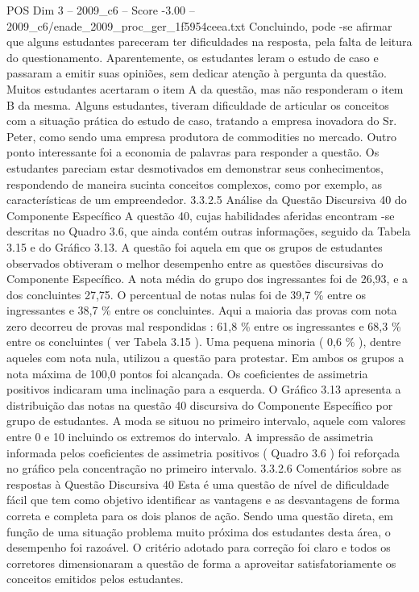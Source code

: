 \begin{textsample}{POS Dim 3 – 2009\_c6 – Score -3.00 – 2009\_c6/enade\_2009\_proc\_ger\_1f5954ceea.txt}
Concluindo, pode -se afirmar que alguns estudantes pareceram ter dificuldades na resposta, pela falta de leitura do questionamento.
Aparentemente, os estudantes leram o estudo de caso e passaram a emitir suas opiniões, sem dedicar atenção à pergunta da questão.
Muitos estudantes acertaram o item A da questão, mas não responderam o item B da mesma.
Alguns estudantes, tiveram dificuldade de articular os conceitos com a situação prática do estudo de caso, tratando a empresa inovadora do Sr.
Peter, como sendo uma empresa produtora de commodities no mercado.
Outro ponto interessante foi a economia de palavras para responder a questão.
Os estudantes pareciam estar desmotivados em demonstrar seus conhecimentos, respondendo de maneira sucinta conceitos complexos, como por exemplo, as características de um empreendedor. 3.3.2.5 Análise da Questão Discursiva 40 do Componente Específico A questão 40, cujas habilidades aferidas encontram -se descritas no Quadro 3.6, que ainda contém outras informações, seguido da Tabela 3.15 e do Gráfico 3.13.
A questão foi aquela em que os grupos de estudantes observados obtiveram o melhor desempenho entre as questões discursivas do Componente Específico.
A nota média do grupo dos ingressantes foi de 26,93, e a dos concluintes 27,75.
O percentual de notas nulas foi de 39,7 \% entre os ingressantes e 38,7 \% entre os concluintes.
Aqui a maioria das provas com nota zero decorreu de provas mal respondidas : 61,8 \% entre os ingressantes e 68,3 \% entre os concluintes ( ver Tabela 3.15 ).
Uma pequena minoria ( 0,6 \% ), dentre aqueles com nota nula, utilizou a questão para protestar.
Em ambos os grupos a nota máxima de 100,0 pontos foi alcançada.
Os coeficientes de assimetria positivos indicaram uma inclinação para a esquerda.
O Gráfico 3.13 apresenta a distribuição das notas na questão 40 discursiva do Componente Específico por grupo de estudantes.
A moda se situou no primeiro intervalo, aquele com valores entre 0 e 10 incluindo os extremos do intervalo.
A impressão de assimetria informada pelos coeficientes de assimetria positivos ( Quadro 3.6 ) foi reforçada no gráfico pela concentração no primeiro intervalo. 3.3.2.6 Comentários sobre as respostas à Questão Discursiva 40 Esta é uma questão de nível de dificuldade fácil que tem como objetivo identificar as vantagens e as desvantagens de forma correta e completa para os dois planos de ação.
Sendo uma questão direta, em função de uma situação problema muito próxima dos estudantes desta área, o desempenho foi razoável.
O critério adotado para correção foi claro e todos os corretores dimensionaram a questão de forma a aproveitar satisfatoriamente os conceitos emitidos pelos estudantes.

\end{textsample}

